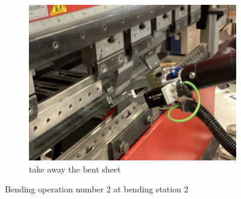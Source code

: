 \begin{figure}[h]
    \begin{subfigure}[b]{0.32\textwidth}
        \centering
        \includegraphics[width=\textwidth]{figures/bending/bending2-002.png}
        \caption{take away the bent sheet}
        \label{subfig:bending2-after}
    \end{subfigure}\hspace{0.1cm}
    \caption{Bending operation number 2 at bending station 2}
    \label{fig:bending-operation-2}
\end{figure}


